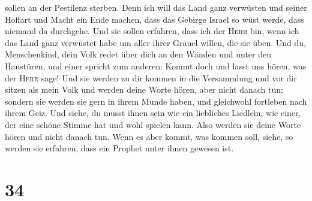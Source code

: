 sollen an der Pestilenz sterben.  Denn ich will das Land
ganz verwüsten und seiner Hoffart und Macht ein Ende machen, dass das
Gebirge Israel so wüst werde, dass niemand da durchgehe. 
Und sie sollen erfahren, dass ich der \textsc{Herr} bin, wenn ich das
Land ganz verwüstet habe um aller ihrer Gräuel willen, die sie üben.
 Und du, Menschenkind, dein Volk redet über dich an den
Wänden und unter den Haustüren, und einer spricht zum anderen: Kommt
doch und lasst uns hören, was der \textsc{Herr} sage! 
Und sie werden zu dir kommen in die Versammlung und vor dir sitzen als
mein Volk und werden deine Worte hören, aber nicht danach tun; sondern
sie werden sie gern in ihrem Munde haben, und gleichwohl fortleben nach
ihrem Geiz.  Und siehe, du musst ihnen sein wie ein
liebliches Liedlein, wie einer, der eine schöne Stimme hat und wohl
spielen kann. Also werden sie deine Worte hören und nicht danach tun.
 Wenn es aber kommt, was kommen soll, siehe, so werden
sie erfahren, dass ein Prophet unter ihnen gewesen ist.

\hypertarget{section-33}{%
\section{34}\label{section-33}}

